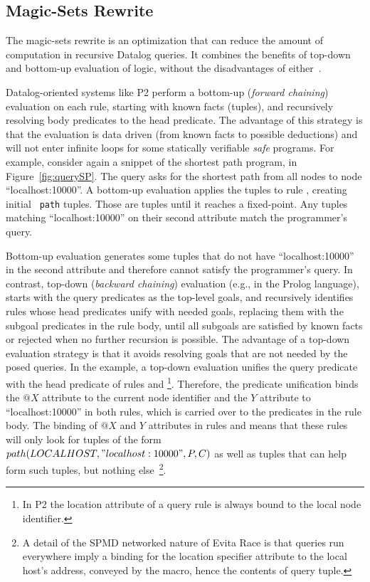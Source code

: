 \subsection{Magic-Sets Rewrite}
\label{sec:magic}

The magic-sets rewrite is an optimization that can reduce the amount 
of computation in recursive Datalog queries. It combines the
benefits of top-down and bottom-up evaluation of logic,
without the disadvantages of either~\cite{ullmanNotes}. 

Datalog-oriented systems like P2 perform a bottom-up (\emph{forward chaining}) evaluation 
on each rule, starting with known facts (tuples), and recursively
resolving body predicates to the head predicate. The advantage of this strategy is
that the evaluation is data driven (from known facts to possible
deductions) and will not enter infinite loops for some statically
verifiable \emph{safe} programs. 
For example, consider again a snippet of the shortest path program, in
Figure~\ref{fig:querySP}. The query asks for the shortest
path from all nodes to node ``localhost:10000''. A bottom-up evaluation
applies the  tuples to rule , creating initial {\tt
path} tuples. Those are  tuples until it reaches a
fixed-point.  Any  tuples matching
``localhost:10000'' on their second attribute match the programmer's query.

Bottom-up evaluation generates some  tuples that do not have
``localhost:10000'' in the second attribute and therefore cannot satisfy
the programmer's query.  In contrast, top-down
(\emph{backward chaining}) evaluation (e.g., in the Prolog language), starts with the query
predicates as the top-level goals, and recursively identifies rules
whose head predicates unify with needed goals, replacing them with the
subgoal predicates in the rule body, until all subgoals are satisfied by
known facts or rejected when no further recursion is possible. The
advantage of a top-down evaluation strategy is that it avoids resolving
goals that are not needed by the posed queries.  In the example, a top-down
evaluation unifies the query
predicate with the head predicate of rules  and
\footnote{In P2 the location attribute of a query rule is always
bound to the local node identifier.}.  Therefore, the 
predicate unification binds the $@X$ attribute to the current node
identifier and the $Y$ attribute to ``localhost:10000'' in both rules,
which is carried over to the predicates in the rule body. The binding of
$@X$ and $Y$ attributes in rules  and  means that these
rules will only look for tuples of the form
$path(LOCALHOST,"localhost:10000",P,C)$ as well as tuples that can help form
such  tuples, but nothing else~\footnote{A
detail of the SPMD networked nature of Evita Race is that queries run
everywhere imply a binding for the location specifier attribute to the
local host's address, conveyed by the  macro, hence the
contents of query tuple.}.


